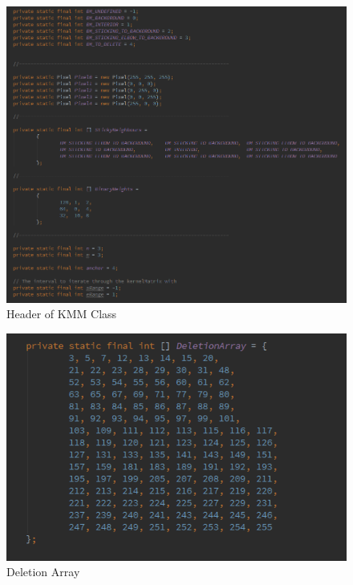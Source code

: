 \documentclass{article}
\begin{document}
%
%
\begin{figure}[H]
\centering

  \includegraphics[width=0.9\linewidth]{res/kmm/class_header.png}

\caption{Header of KMM Class}
\label{fig:kmm_header}
\end{figure}



%
%
\begin{figure}[H]
\centering

  \includegraphics[width=0.9\linewidth]{res/kmm/deletion.png}

\caption{Deletion Array}
\label{fig:kmm_deletion}
\end{figure}
\end{document}
